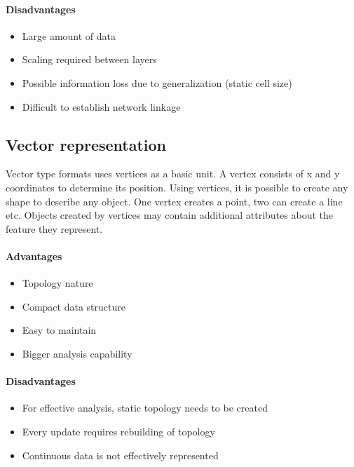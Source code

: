 \documentclass[thesis=M,english]{FITthesis}[2012/10/20]
\begin{document}
\paragraph*{Disadvantages}
\begin{itemize}[noitemsep]
\item Large amount of data
\item Scaling required between layers
\item Possible information loss due to generalization (static cell size)
\item Difficult to establish network linkage
\end{itemize}

\subsection{Vector representation}
Vector type formats uses vertices as a basic unit. A vertex consists of x and y coordinates to determine its position. Using vertices, it is possible to create any shape to describe any object. One vertex creates a point, two can create a line etc. Objects created by vertices may contain additional attributes about the feature they represent.

\paragraph*{Advantages}
\begin{itemize}[noitemsep]
\item Topology nature
\item Compact data structure
\item Easy to maintain
\item Bigger analysis capability
\end{itemize}

\paragraph*{Disadvantages}
\begin{itemize}[noitemsep]
\item For effective analysis, static topology needs to be created
\item Every update requires rebuilding of topology
\item Continuous data is not effectively represented
\end{itemize}

\end{document}
